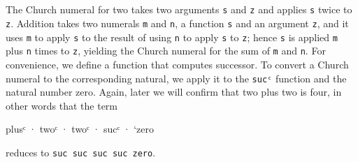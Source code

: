 \begin{fence}
\begin{code}
\AgdaSpace{}%
\<%
\\
%
\>[9]\AgdaSpace{}%
\AgdaSpace{}%
\AgdaSpace{}%
\AgdaSpace{}%
\AgdaSpace{}%
\AgdaSpace{}%
\AgdaSymbol{(}\AgdaSpace{}%
\AgdaSpace{}%
\AgdaSpace{}%
\AgdaSpace{}%
\AgdaSpace{}%
\AgdaSpace{}%
\AgdaSpace{}%
\AgdaSymbol{)}\<%
\\
%
\\[\AgdaEmptyExtraSkip]%
\>[0]\AgdaSpace{}%
\AgdaSymbol{:}\AgdaSpace{}%
\<%
\\
\>[0]\AgdaSpace{}%
\AgdaSymbol{=}\AgdaSpace{}%
\AgdaSpace{}%
\AgdaSpace{}%
\AgdaSpace{}%
\AgdaSpace{}%
\AgdaSymbol{(}\AgdaSpace{}%
\AgdaSymbol{)}\<%
\end{code}
\end{fence}

The Church numeral for two takes two arguments \texttt{s} and \texttt{z}
and applies \texttt{s} twice to \texttt{z}. Addition takes two numerals
\texttt{m} and \texttt{n}, a function \texttt{s} and an argument
\texttt{z}, and it uses \texttt{m} to apply \texttt{s} to the result of
using \texttt{n} to apply \texttt{s} to \texttt{z}; hence \texttt{s} is
applied \texttt{m} plus \texttt{n} times to \texttt{z}, yielding the
Church numeral for the sum of \texttt{m} and \texttt{n}. For
convenience, we define a function that computes successor. To convert a
Church numeral to the corresponding natural, we apply it to the
\texttt{sucᶜ} function and the natural number zero. Again, later we will
confirm that two plus two is four, in other words that the term

\begin{myDisplay}
plusᶜ · twoᶜ · twoᶜ · sucᶜ · `zero
\end{myDisplay}

reduces to
\texttt{\textasciigrave{}suc\ \textasciigrave{}suc\ \textasciigrave{}suc\ \textasciigrave{}suc\ \textasciigrave{}zero}.

